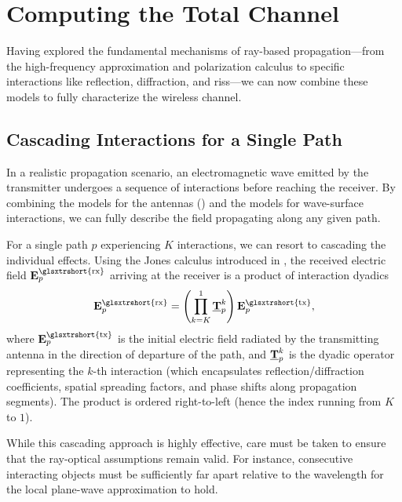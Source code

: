 \section{Computing the Total Channel}

Having explored the fundamental mechanisms of ray-based propagation---from the high-frequency approximation and polarization calculus to specific interactions like reflection, diffraction, and \glspl{ris}---we can now combine these models to fully characterize the wireless channel.

\subsection{Cascading Interactions for a Single Path}

In a realistic propagation scenario, an electromagnetic wave emitted by the transmitter undergoes a sequence of interactions before reaching the receiver. By combining the models for the antennas () and the models for wave-surface interactions, we can fully describe the field propagating along any given path.

For a single path $p$ experiencing $K$ interactions, we can resort to cascading the individual effects. Using the Jones calculus introduced in , the received electric field $\bsup{E}_p^{\text{\glsxtrshort{rx}}}$ arriving at the receiver is a product of interaction dyadics
\begin{equation}
  \bsup{E}_p^{\text{\glsxtrshort{rx}}} = \left( \prod_{k=K}^{1} \dyadic{T}_{p}^{k} \right) \bsup{E}_{p}^\text{\glsxtrshort{tx}},
\end{equation}
where $\bsup{E}_{p}^\text{\glsxtrshort{tx}}$ is the initial electric field radiated by the transmitting antenna in the direction of departure of the path, and $\underline{\mathbf{T}}_{p}^{k}$ is the dyadic operator representing the $k$-th interaction (which encapsulates reflection/diffraction coefficients, spatial spreading factors, and phase shifts along propagation segments). The product is ordered right-to-left (hence the index running from $K$ to $1$).

While this cascading approach is highly effective, care must be taken to ensure that the ray-optical assumptions remain valid. For instance, consecutive interacting objects must be sufficiently far apart relative to the \gls{wavelength} for the local plane-wave approximation to hold.

